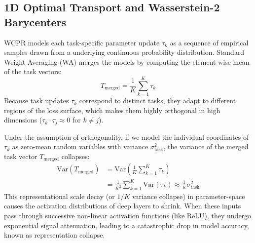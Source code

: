 \documentclass{article}
\theoremstyle{plain}
\theoremstyle{definition}
\theoremstyle{remark}
\begin{document}
\subsection{1D Optimal Transport and Wasserstein-2 Barycenters}
WCPR \cite{theorist2026wcpr} models each task-specific parameter update $\tau_k$ as a sequence of empirical samples drawn from a underlying continuous probability distribution. Standard Weight Averaging (WA) merges the models by computing the element-wise mean of the task vectors:
\begin{equation}
    T_{\text{merged}} = \frac{1}{K}\sum_{k=1}^K \tau_k
\end{equation}
Because task updates $\tau_k$ correspond to distinct tasks, they adapt to different regions of the loss surface, which makes them highly orthogonal in high dimensions ($\tau_k \cdot \tau_j \approx 0$ for $k \neq j$). 

Under the assumption of orthogonality, if we model the individual coordinates of $\tau_k$ as zero-mean random variables with variance $\sigma_{\text{task}}^2$, the variance of the merged task vector $T_{\text{merged}}$ collapses:
\begin{equation}
\begin{split}
    \text{Var}(T_{\text{merged}}) &= \text{Var}\left( \frac{1}{K} \sum_{k=1}^K \tau_k \right) \\
    &= \frac{1}{K^2} \sum_{k=1}^K \text{Var}(\tau_k) \approx \frac{1}{K} \sigma_{\text{task}}^2
\end{split}
\end{equation}
This representational scale decay (or $1/K$ variance collapse) in parameter-space causes the activation distributions of deep layers to shrink. When these inputs pass through successive non-linear activation functions (like ReLU), they undergo exponential signal attenuation, leading to a catastrophic drop in model accuracy, known as representation collapse.
\end{document}
